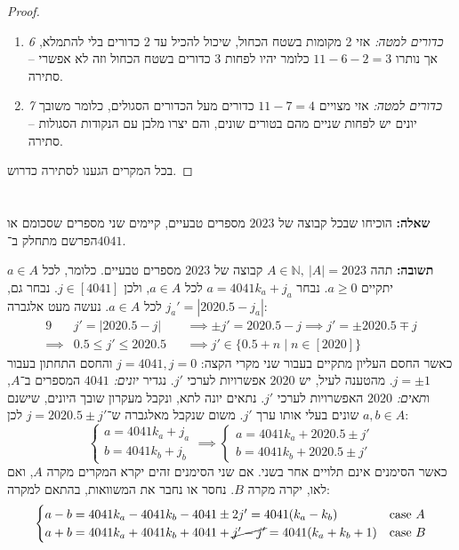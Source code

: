\documentclass[]{article}
\newcommand\N     {\mathbb{N}}
\begin{document}
\begin{enumerate}[(a)]
\begin{proof}
\begin{enumerate}
				\item \textit{6 כדורים למטה: }אזי 2 מקומות בשטח הכחול, שיכול להכיל עד 2 כדורים בלי להתמלא, אך נותרו $ 11 - 6 - 2 = 3 $ כלומר יהיו לפחות 3 כדורים בשטח הכחול וזה לא אפשרי – סתירה. 
				\item \textit{7 כדורים למטה: }אזי מצויים $11 - 7 = 4$ כדורים מעל הכדורים הסגולים, כלומר משובך יונים יש לפחות שניים מהם בטורים שונים, והם יצרו מלבן עם הנקודות הסגולות – סתירה. 
			\end{enumerate}
			בכל המקרים הגענו לסתירה כדרוש. 
		\end{proof}
	\end{enumerate}
	
	\section{} %
	\textbf{שאלה: }הוכיחו שבכל קבוצה של $2023$ מספרים טבעיים, קיימים שני מספרים שסכומם או הפרשם מתחלק ב־$4041$. 
	
	\textbf{תשובה: }תהה $A \in \N, \ |A| = 2023$ קבוצה של $2023$ מספרים טבעיים. כלומר, לכל $a \in A$ יתקיים $a \ge 0$. נבחר $a = 4041k_a + j_a$ לכל $a \in A$, ולכן $j \in [4041]$. נבחר גם, $j_a' = |2020.5 - j_a|$ לכל $a \in A$. נעשה מעט אלגברה: 
	\begin{alignat*}{9}
		&j' = |2020.5 - j| &&\implies \pm j' = 2020.5 - j \implies j' =  \pm 2020.5 \mp j \\
		\implies &0.5 \le j' \le 2020.5 &&\implies j' \in \{0.5 + n \mid n \in [2020]\}
	\end{alignat*}
	כאשר החסם העליון מתקיים בעבור שני מקרי הקצה: $j = 4041, j = 0 $ והחסם התחתון בעבור $j = \pm 1 $. מהטענה לעיל, יש $2020$ אפשרויות לערכי $j'$. נגדיר \textit{יונים: }$4041$ המספרים ב־$A$, ו\textit{תאים: }$2020$ האפשרויות לערכי $j'$. נתאים יונה לתא, ונקבל מעקרון שובך היונים, שישנם $a, b \in A $ שונים בעלי אותו ערך $j'$. משום שנקבל מאלגברה ש־$j = 2020.5 \pm j' $
	לכן: 
	\[ \begin{cases}
		a = 4041k_a + j_a \\
		b = 4041k_b + j_b
	\end{cases} \implies \begin{cases}
		a = 4041k_a + 2020.5 \pm j' \\
		b = 4041k_b + 2020.5 \pm j'
	\end{cases} \]
	כאשר הסימנים אינם תלויים אחר בשני. אם שני הסימנים זהים יקרא המקרים מקרה $A$, ואם לאו, יקרה מקרה $B$. נחסר או נחבר את המשוואות, בהתאם למקרה: 
	\[ \begin{cases}
		a - b = 4041k_a - 4041k_b - 4041 \pm 2j' = 4041(k_a  - k_b) &\text{case}\ A\\
		a + b = 4041k_a + 4041k_b + 4041 + \cancel{j' - j'} = 4041(k_a + k_b + 1) &\text{case} \ B
	\end{cases} \]
	
\end{document}
